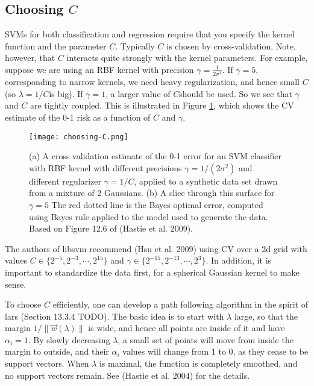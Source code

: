 \subsection{Choosing $C$}
\label{sec:SVM-Choosing-C}
SVMs for both classification and regression require that you specify the kernel function and the parameter $C$. Typically $C$ is chosen by cross-validation. Note, however, that $C$ interacts quite strongly with the kernel parameters. For example, suppose we are using an RBF kernel with precision $\gamma=\frac{1}{2\sigma^2}$. If $\gamma=5$, corresponding to narrow kernels, we need heavy regularization, and hence small $C$(so $\lambda=1/C$is big). If $\gamma=1$, a larger value of $C$should be used. So we see that $\gamma$ and $C$ are tightly coupled. This is illustrated in Figure \ref{fig:choosing-C}, which shows the CV estimate of the 0-1 risk as a function of $C$ and $\gamma$.

\begin{figure}[hbtp]
\centering
    \texttt{[image: choosing-C.png]}
\caption{(a) A cross validation estimate of the 0-1 error for an SVM classifier with RBF kernel with different precisions $\gamma=1/(2\sigma^2)$ and different regularizer $\gamma=1/C$, applied to a synthetic data set drawn from a mixture of 2 Gaussians. (b) A slice through this surface for $\gamma=5$ The red dotted line is the Bayes optimal error, computed using Bayes rule applied to the model used to generate the data. Based on Figure 12.6 of (Hastie et al. 2009). }
\label{fig:choosing-C} 
\end{figure}

The authors of libsvm recommend (Hsu et al. 2009) using CV over a 2d grid with values $C \in \{2^{−5},2^{−3},\cdots,2^{15}\}$ and $\gamma \in \{2^{−15},2^{−13},\cdots,2^3\}$. In addition, it is important to standardize the data first, for a spherical Gaussian kernel to make sense.

To choose $C$ efficiently, one can develop a path following algorithm in the spirit of lars (Section 13.3.4 TODO). The basic idea is to start with $\lambda$ large, so that the margin $1/\lVert\vec{w}(\lambda)\rVert$ is wide, and hence all points are inside of it and have $\alpha_i =1$. By slowly decreasing $\lambda$, a small set of points will move from inside the margin to outside, and their $\alpha_i$ values will change from 1 to 0, as they cease to be support vectors. When $\lambda$ is maximal, the function is completely smoothed, and no support vectors remain. See (Hastie et al. 2004) for the details.


